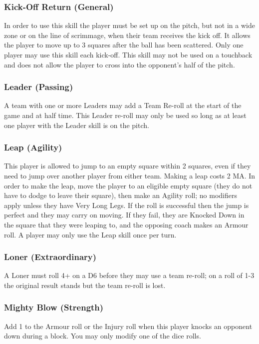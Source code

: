 \begin{multicols}{3}
\subsubsection{Kick-Off Return (General)}
\par In order to use this skill the player must be set up on the pitch, but not in a wide zone or on the line of scrimmage, when their team receives the kick off. It allows the player to move up to 3 squares after the ball has been scattered. Only one player may use this skill each kick-off. This skill may not be used on a touchback and does not allow the player to cross into the opponent's half of the pitch.

\subsubsection{Leader (Passing)}
\par A team with one or more Leaders may add a Team Re-roll at the start of the game and at half time. This Leader re-roll may only be used so long as at least one player with the Leader skill is on the pitch.

\subsubsection{Leap (Agility)}
\par This player is allowed to jump to an empty square within 2 squares, even if they need to jump over another player from either team. Making a leap costs 2 MA. In order to make the leap, move the player to an eligible empty square (they do not have to dodge to leave their square), then make an Agility roll; no modifiers apply unless they have Very Long Legs. If the roll is successful then the jump is perfect and they may carry on moving. If they fail, they are Knocked Down in the square that they were leaping to, and the opposing coach makes an Armour roll. A player may only use the Leap skill once per turn.

\subsubsection{Loner (Extraordinary)}
\par A Loner must roll 4+ on a D6 before they may use a team re-roll; on a roll of 1-3 the original result stands but the team re-roll is lost.

\subsubsection{Mighty Blow (Strength)}
\par Add 1 to the Armour roll or the Injury roll when this player knocks an opponent down during a block. You may only modify one of the dice rolls.


\end{multicols}
